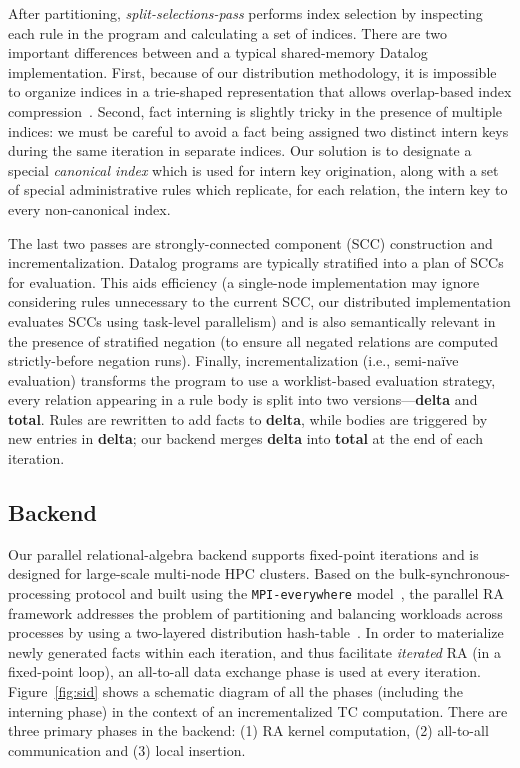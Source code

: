 After partitioning, \emph{split-selections-pass} performs index
selection by inspecting each rule in the program and calculating a set
of indices. There are two important differences between \slog{} and a
typical shared-memory Datalog implementation. First, because of our
distribution methodology, it is impossible to organize indices in a
trie-shaped representation that allows overlap-based index
compression~\cite{Subotic:2018:AIS:3282495.3302538}. Second, fact
interning is slightly tricky in the presence of multiple indices: we
must be careful to avoid a fact being assigned two distinct intern
keys during the same iteration in separate indices. Our solution is to
designate a special \emph{canonical index} which is used for intern
key origination, along with a set of special administrative rules which
replicate, for each relation, the intern key to every non-canonical
index. 

The last two passes are strongly-connected component (SCC)
construction and incrementalization. Datalog programs are typically
stratified into a plan of SCCs for evaluation. This aids efficiency (a
single-node implementation may ignore considering rules unnecessary to
the current SCC, our distributed implementation evaluates SCCs using
task-level parallelism) and is also semantically relevant in the
presence of stratified negation (to ensure all negated relations are
computed strictly-before negation runs). Finally, incrementalization
(i.e., semi-na\"ive evaluation) transforms the program to use a
worklist-based evaluation strategy, every relation appearing in a rule
body is split into two versions---\textbf{delta} and
\textbf{total}. Rules are rewritten to add facts to \textbf{delta},
while bodies are triggered by new entries in \textbf{delta}; our
backend merges \textbf{delta} into \textbf{total} at the end of each
iteration.

\subsection{Backend}

Our parallel relational-algebra backend supports fixed-point
iterations and is designed for large-scale multi-node HPC
clusters. Based on the bulk-synchronous-processing protocol and built
using the \texttt{MPI-everywhere} model~\cite{forum1994mpi, zambre2021logically},
the parallel RA framework addresses the problem of partitioning and balancing workloads across
processes by using a two-layered distribution
hash-table~\cite{kumar:hipc:2019}. In order to materialize newly generated facts within each iteration, and thus facilitate \emph{iterated} RA (in a fixed-point loop), an all-to-all data exchange phase is used at every iteration. Figure~\ref{fig:sid} shows a schematic diagram of all the phases (including the interning phase) in the context of an incrementalized TC computation. There are three primary phases in the backend: (1) RA kernel computation, (2) all-to-all communication and (3) local insertion.

